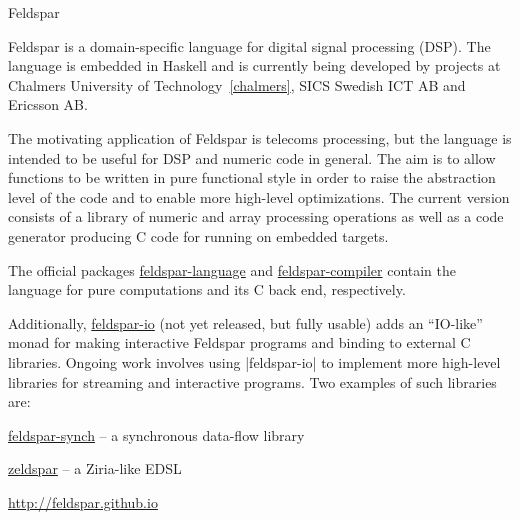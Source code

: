 \begin{hcarentry}{Feldspar}
\label{feldspar}
\makeheader

Feldspar is a domain-specific language for digital signal processing (DSP). The
language is embedded in Haskell and is currently being developed by projects at
Chalmers University of Technology~\cref{chalmers}, SICS Swedish ICT AB and
Ericsson AB.

The motivating application of Feldspar is telecoms processing, but the language
is intended to be useful for DSP and numeric code in general. The aim is to
allow functions to be written in pure functional style in order to raise the
abstraction level of the code and to enable more high-level optimizations. The
current version consists of a library of numeric and array processing operations
as well as a code generator producing C code for running on embedded targets.

The official packages \href{http://hackage.haskell.org/package/feldspar-language}{feldspar-language} and \href{http://hackage.haskell.org/package/feldspar-compiler}{feldspar-compiler} contain the language for pure computations and its C back end, respectively.

Additionally, \href{https://github.com/emilaxelsson/feldspar-io}{feldspar-io} (not yet released, but fully usable) adds an ``IO-like'' monad for making interactive Feldspar programs and binding to external C libraries. Ongoing work involves using \pre|feldspar-io| to implement more high-level libraries for streaming and interactive programs. Two examples of such libraries are:
\begin{compactitem}
\item \href{https://github.com/emilaxelsson/feldspar-synch}{feldspar-synch} -- a synchronous data-flow library
\item \href{https://github.com/koengit/zeldspar}{zeldspar} -- a Ziria-like EDSL
\end{compactitem}

\FurtherReading
\begin{compactitem}
\item \url{http://feldspar.github.io}
\end{compactitem}
\end{hcarentry}
